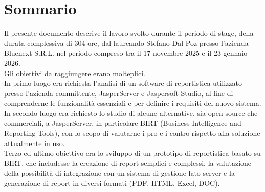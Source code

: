 \cleardoublepage
{}
{}
\begingroup
\let\clearpage\relax
\let\cleardoublepage\relax
\let\cleardoublepage\relax

\chapter*{Sommario}

Il presente documento descrive il lavoro svolto durante il periodo di stage, della durata complessiva di 304 ore, dal laureando Stefano Dal Poz presso l'azienda Bluenext S.R.L. nel periodo compreso tra il 17 novembre 2025 e il 23 gennaio 2026.\\
Gli obiettivi da raggiungere erano molteplici.\\
In primo luogo era richiesta l'analisi di un software di reportistica utilizzato presso l'azienda committente, JasperServer e Jaspersoft Studio, al fine di comprenderne le funzionalità essenziali e per definire i requisiti del nuovo sistema.\\
In secondo luogo era richiesto lo studio di alcune alternative, sia open source che commerciali, a JasperServer, in particolare BIRT (Business Intelligence and Reporting Tools), con lo scopo di valutarne i pro e i contro rispetto alla soluzione attualmente in uso.\\
Terzo ed ultimo obiettivo era lo sviluppo di un prototipo di reportistica basato su BIRT, che includesse la creazione di report semplici e complessi, la valutazione della possibilità di integrazione con un sistema di gestione lato server e la generazione di report in diversi formati (PDF, HTML, Excel, DOC).




\endgroup

\vfill
